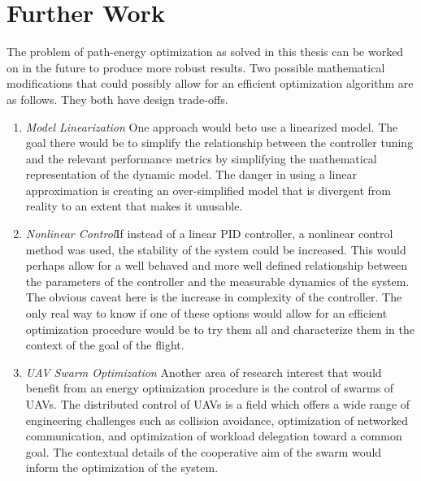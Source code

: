 \section{Further Work}

The problem of path-energy optimization as solved in this thesis can be worked on in the future to produce more robust results. Two possible mathematical modifications that could possibly allow for an efficient optimization algorithm are as follows. They both have design trade-offs.

\begin{enumerate}

\item \textit{Model Linearization} One approach would beto use a linearized model. The goal there would be to simplify the relationship between the controller tuning and the relevant performance metrics by simplifying the mathematical representation of the dynamic model. The danger in using a linear approximation is creating an over-simplified model that is divergent from reality to an extent that makes it unusable.

\item \textit{Nonlinear Control}If instead of a linear PID controller, a nonlinear control method was used, the stability of the system could be increased. This would perhaps allow for a well behaved and more well defined relationship between the parameters of the controller and the measurable dynamics of the system. The obvious caveat  here is the increase in complexity of the controller. The only real way to know if one of these options would allow for an efficient optimization procedure would be to try them all and characterize them in the context of the goal of the flight.

\item \textit{UAV Swarm Optimization} Another area of research interest that would benefit from an energy optimization procedure is the control of swarms of UAVs. The distributed control of UAVs is a field which offers a wide range of engineering challenges such as collision avoidance, optimization of networked communication, and optimization of workload delegation toward a common goal. The contextual details of the cooperative aim of the swarm would inform the optimization of the system.



\end{enumerate}
